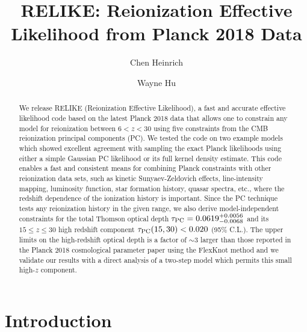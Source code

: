\documentclass[aps,prd,twocolumn,amsmath,amssymb,showpacs,floatfix,superscriptaddress,nofootinbib]{revtex4-1}
\begin{document}
	
\title{RELIKE: Reionization Effective Likelihood from Planck 2018 Data} 

\author{Chen Heinrich}

\author{Wayne Hu}

\begin{abstract}

We release RELIKE (Reionization Effective Likelihood), a fast and accurate effective likelihood code based on the latest Planck 2018 data 
that allows one to constrain any model for reionization between $6 < z < 30$ using five constraints from the CMB reionization principal components (PC). We tested the code on two example models which showed excellent agreement with sampling the exact Planck likelihoods using either a simple Gaussian PC likelihood or its full kernel density estimate.
This code enables a fast and consistent means for 
combining Planck constraints with other reionization data sets, such as kinetic Sunyaev-Zeldovich effects, line-intensity mapping, luminosity function, star formation history, quasar spectra, etc., where the redshift dependence of the ionization history is important.  
Since the PC technique tests any reionization history in the given range, we also derive model-independent constraints for the total Thomson optical depth $\tau_{\rm PC} = 0.0619^{+0.0056}_{-0.0068}$ and its $15\le z \le 30$ high redshift component $\tau_{\rm PC}(15, 30) < 0.020 $ (95\% C.L.).
The upper limits on the high-redshift optical depth is a factor of $\sim3$ larger than those reported in the Planck 2018 cosmological parameter paper using the FlexKnot method
and we validate our results with a direct analysis of a two-step model which permits this small high-$z$ component.

\end{abstract}

\maketitle

\section{Introduction}
\label{sec:intro}
\end{document}
